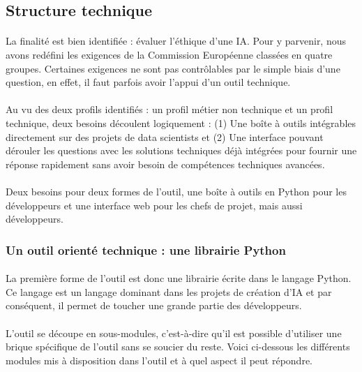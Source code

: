 \documentclass[10pt, french, a4paper]{report}
\begin{document}
\subsection{Structure technique}

\paragraph{}
La finalité est bien identifiée : évaluer l'éthique d'une IA. Pour y parvenir, nous avons redéfini les exigences de la Commission Européenne classées en quatre groupes. Certaines exigences ne sont pas contrôlables par le simple biais d'une question, en effet, il faut parfois avoir l'appui d'un outil technique. 

\paragraph{}
Au vu des deux profils identifiés : un profil métier non technique et un profil technique, deux besoins découlent logiquement : (1) Une boîte à outils intégrables directement sur des projets de data scientists et (2) Une interface pouvant dérouler les questions avec les solutions techniques déjà intégrées pour fournir une réponse rapidement sans avoir besoin de compétences techniques avancées.

\paragraph{}
Deux besoins pour deux formes de l'outil, une boîte à outils en Python pour les développeurs et une interface web pour les chefs de projet, mais aussi développeurs.

\subsubsection{Un outil orienté technique : une librairie Python}

\paragraph{}
La première forme de l'outil est donc une librairie écrite dans le langage Python. Ce langage est un langage dominant dans les projets de création d'IA et par conséquent, il permet de toucher une grande partie des développeurs. 

\paragraph{}
L'outil se découpe en sous-modules, c'est-à-dire qu'il est possible d'utiliser une brique spécifique de l'outil sans se soucier du reste. Voici ci-dessous les différents modules mis à disposition dans l'outil et à quel aspect il peut répondre.
\end{document}
